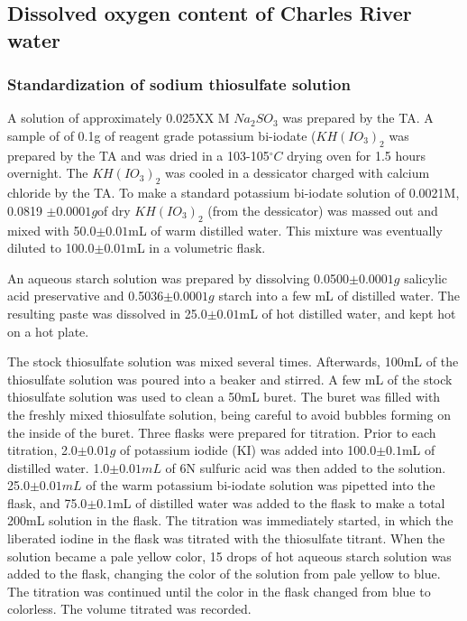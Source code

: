 \subsection{Dissolved oxygen content of Charles River water}
\subsubsection{Standardization of sodium thiosulfate solution}
A solution of approximately 0.025XX M $Na_2SO_3$ was prepared by the TA. A sample of of 0.1g of reagent grade potassium bi-iodate ($KH(IO_3)_2$ was prepared by the TA and was dried in a 103-105$^{\circ}C$ drying oven for 1.5 hours overnight. The $KH(IO_3)_2$ was cooled in a dessicator charged with calcium chloride by the TA. To make a standard potassium bi-iodate solution of 0.0021M, 0.0819 $\pm 0.0001g$of dry $KH(IO_3)_2$ (from the dessicator) was massed out and mixed with 50.0$\pm 0.01$mL of warm distilled water. This mixture was eventually diluted to 100.0$\pm0.01$mL in a volumetric flask. 

An aqueous starch solution was prepared by dissolving 0.0500$\pm 0.0001g$ salicylic acid preservative and 0.5036$\pm0.0001g$ starch into a few mL of distilled water. The resulting paste was dissolved in 25.0$\pm0.01$mL of hot distilled water, and kept hot on a hot plate.

The stock thiosulfate solution was mixed several times. Afterwards, 100mL of the thiosulfate solution was poured into a beaker and stirred. A few mL of the stock thiosulfate solution was used to clean a 50mL buret. The buret was filled with the freshly mixed thiosulfate solution, being careful to avoid bubbles forming on the inside of the buret. Three flasks were prepared for titration. Prior to each titration, 2.0$\pm0.01g$ of potassium iodide (KI) was added into 100.0$\pm0.1$mL of distilled water. 1.0$\pm0.01mL$ of 6N sulfuric acid was then added to the solution. 25.0$\pm0.01mL$ of the warm potassium bi-iodate solution was pipetted into the flask, and 75.0$\pm0.1$mL of distilled water was added to the flask to make a total 200mL solution in the flask. The titration was immediately started, in which the liberated iodine in the flask was titrated with the thiosulfate titrant. When the solution became a pale yellow color, 15 drops of hot aqueous starch solution was added to the flask, changing the color of the solution from pale yellow to blue. The titration was continued until the color in the flask changed from blue to colorless. The volume titrated was recorded.

